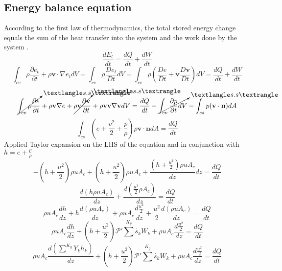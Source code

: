 \documentclass[11pt]{article}
\begin{document}
\subsection{Energy balance equation}
According to the first law of thermodynamics, the total stored energy change equals the sum of the heat transfer into the system and the work done by the system \cite{kee2005chemically,larson1996plug}.
\begin{equation}
    \frac{dE_t}{dt} = \frac{dQ}{dt} + \frac{dW}{dt}
\end{equation}
\begin{equation}
    \int_{cv}\rho \frac{\partial e_t}{\partial t} + \rho \textbf{v}\cdot \nabla e_t dV = \int_{cv}\rho \frac{De_t}{Dt}dV  =\int_{cv}\rho(\frac{De}{Dt}+\textbf{v}\frac{D\textbf{v}}{Dt})dV=\frac{dQ}{dt} + \frac{dW}{dt}
\end{equation}
\begin{equation}
    \cancelto{〈s.s〉}{\int_{cv}\rho\frac{\partial e}{\partial t}}+\rho \textbf{v}\nabla e +\cancelto{〈s.s〉}{\rho\textbf{v}\frac{\partial \textbf{v}}{\partial t}} + \rho \textbf{v} \textbf{v}\nabla \textbf{v} dV = \frac{dQ}{dt} - \cancelto{〈s.s〉}{\int_{cv}\frac{\partial p}{\partial t}dV} - \int_{cs}p(\textbf{v}\cdot \textbf{n})dA
\end{equation}
\begin{equation}
    \int_{cs}(e+\frac{v^2}{2}+\frac{p}{\rho})\rho \textbf{v}\cdot\textbf{n}dA = \frac{dQ}{dt}
\end{equation}
Applied Taylor expansion on the LHS of the equation and in conjunction with $h = e + \frac{p}{\rho}$
\begin{equation}
    -(h+\frac{u^2}{2})\rho u A_c + (h+\frac{u^2}{2})\rho u A_c + \frac{(h+\frac{u^2}{2})\rho u A_c}{dz}dz = \frac{dQ}{dt}
\end{equation}
\begin{equation}
   \frac{d(h\rho u A_c)}{dz} + \frac{d(\frac{u^3}{2}\rho A_c)}{dz} = \frac{dQ}{dt}
\end{equation}
\begin{equation}
    \rho u A_c \frac{dh}{dz} + h\frac{d(\rho u A_c)}{dz} + \rho u A_c\frac{d\frac{u^2}{2}}{dz} + \frac{u^2}{2}\frac{d(\rho u A_c)}{dz} = \frac{dQ}{dt}
\end{equation}
\begin{equation}
    \rho u A_c \frac{dh}{dz} + (h+\frac{u^2}{2})\mathscr{P}'\sum^{K_g}\dot{s_k} W_k + \rho u A_c\frac{d\frac{u^2}{2}}{dz} = \frac{dQ}{dt}
\end{equation}
\begin{equation}
    \rho u A_c \frac{d(\sum^{K_g} Y_k h_k)}{dz} + (h+\frac{u^2}{2})\mathscr{P}'\sum^{K_g}\dot{s_k} W_k + \rho u A_c\frac{d\frac{u^2}{2}}{dz} = \frac{dQ}{dt}
\end{equation}
\end{document}
